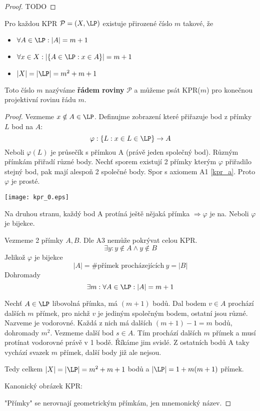 \begin{proof}
    TODO
\end{proof}
\begin{theorem}
    Pro každou KPR $\mathcal{P}=(X,\LP)$ existuje přirozené číslo $m$ takové, že
    \begin{itemize}
        \item $\forall A\in\LP: |A|=m+1$
        \item $\forall x\in X: |\{A\in\LP: x\in A\}|=m+1$
        \item $|X|=|\LP|=m^2+m+1$
    \end{itemize}

    Toto číslo $m$ nazýváme \textbf{řádem roviny} $\mathcal{P}$ a můžeme psát KPR($m$) pro konečnou projektivní rovinu řádu $m$.
\end{theorem}
\begin{proof}
	Vezmeme $x \notin A \in \LP$.
	Definujme zobrazení které přiřazuje bod z přímky $L$ bod na $A$:
	\[ \varphi:\{ L: x \in L \in \LP \} \to A \]
	Neboli $\varphi(L)$ je průsečík s přímkou A (právě jeden společný bod).
	Různým přímkám přiřadí různé body.
	Nechť sporem existují 2 přímky kterým $\varphi$ přiřadilo stejný bod, pak mají alespoň 2 společné body. Spor s axiomem A1 \cref{kpr_a}.
	Proto $\varphi$ je prosté.

	\texttt{[image: kpr\_0.eps]}

	Na druhou stranu, každý bod A protíná ještě nějaká přímka $\Rightarrow \varphi$ je na.
	Neboli $\varphi$ je bijekce.

	Vezmeme 2 přímky $A, B$. Dle A3 nemůže pokrývat celou KPR.
	\[ \exists y: y \notin A \land y \notin B \]
	Jelikož $\varphi$ je bijekce
	\[ |A| = \text{\# přímek procházejících}\ y = |B| \]
	Dohromady
	\[ \exists m: \forall A \in \LP: |A| = m + 1 \]

	Nechť $A \in \LP$ libovolná přímka, má $(m + 1)$ bodů.
	Dal bodem $v \in A$ prochází dalších $m$ přímek, pro nichž $v$ je jediným společným bodem, ostatní jsou různé.
	Nazveme je vodorovné.
	Každá z nich má dalších $(m + 1) - 1 = m$ bodů, dohromady $m^2$.
	Vezmeme další bod $s \in A$. Tím prochází dalších $m$ přímek a musí protínat vodorovné právě v 1 bodě.
	Říkáme jim svislé.
	Z ostatních bodů A taky vychází svazek $m$ přímek, další body již ale nejsou.

	Tedy celkem $|X|=|\LP|=m^2+m+1$ bodů a $|\LP| = 1 + m(m +1)$ přímek.

	Kanonický obrázek KPR:

	"Přímky" se nerovnají geometrickým přímkám, jen mnemonický název.
\end{proof}
